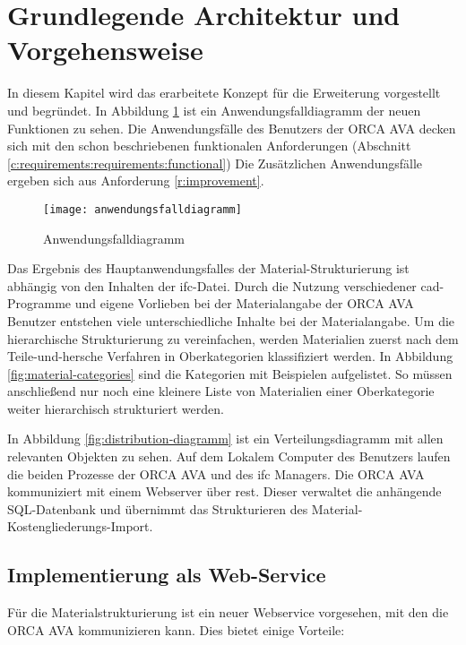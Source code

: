 \section{Grundlegende Architektur und Vorgehensweise}
\label{c:conception:architecture}
In diesem Kapitel wird das erarbeitete Konzept für die Erweiterung vorgestellt und begründet. In Abbildung \ref{fig:usecasediagramm} ist ein Anwendungsfalldiagramm der neuen Funktionen zu sehen. Die Anwendungsfälle des Benutzers der ORCA AVA decken sich mit den schon beschriebenen funktionalen Anforderungen (Abschnitt \ref{c:requirements:requirements:functional}) Die Zusätzlichen Anwendungsfälle ergeben sich aus Anforderung \ref{r:improvement}.

\begin{figure}[h]
	\centering
	\texttt{[image: anwendungsfalldiagramm]}
	\caption[Anwendungsfalldiagramm]{Anwendungsfalldiagramm}
	\label{fig:usecasediagramm}
\end{figure}

Das Ergebnis des Hauptanwendungsfalles der Material-Strukturierung ist abhängig von den Inhalten der \ac{ifc}-Datei. Durch die Nutzung verschiedener \ac{cad}-Programme und eigene Vorlieben bei der Materialangabe der ORCA AVA Benutzer entstehen viele unterschiedliche Inhalte bei der Materialangabe.
Um die hierarchische Strukturierung zu vereinfachen, werden Materialien zuerst nach dem \glqq Teile-und-hersche\grqq{} Verfahren in Oberkategorien klassifiziert werden. In Abbildung \ref{fig:material-categories} sind die Kategorien mit Beispielen aufgelistet. So müssen anschließend nur noch eine kleinere Liste von Materialien einer Oberkategorie weiter hierarchisch strukturiert werden.

In Abbildung \ref{fig:distribution-diagramm} ist ein Verteilungsdiagramm mit allen relevanten Objekten zu sehen. Auf dem Lokalem Computer des Benutzers laufen die beiden Prozesse der ORCA AVA und des \ac{ifc} Managers. Die ORCA AVA kommuniziert mit einem Webserver über \ac{rest}. Dieser verwaltet die anhängende SQL-Datenbank und übernimmt das Strukturieren des Material-Kostengliederungs-Import.

\subsection{Implementierung als Web-Service}
\label{c:conception:service}
Für die Materialstrukturierung ist ein neuer Webservice vorgesehen, mit den die ORCA AVA kommunizieren kann. Dies bietet einige Vorteile:

